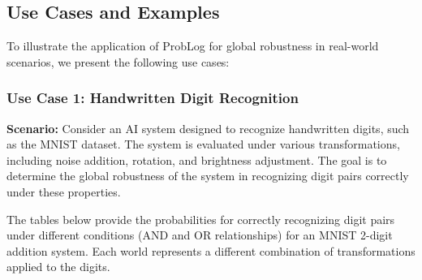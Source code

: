 \subsection{Use Cases and Examples}
To illustrate the application of ProbLog for global robustness in real-world scenarios, we present the following use cases:

\subsubsection{Use Case 1: Handwritten Digit Recognition}
\textbf{Scenario:} Consider an AI system designed to recognize handwritten digits, such as the MNIST dataset. The system is evaluated under various transformations, including noise addition, rotation, and brightness adjustment. The goal is to determine the global robustness of the system in recognizing digit pairs correctly under these properties.

The tables below provide the probabilities for correctly recognizing digit pairs under different conditions (AND and OR relationships) for an MNIST 2-digit addition system. Each world represents a different combination of transformations applied to the digits.

\begin{table}[h]
    \centering
    \caption{Specification Probabilities for MNIST 2-Digit Addition Under Different Transformations}
    \label{tab:mnist_prob_and_or}
\end{table}

